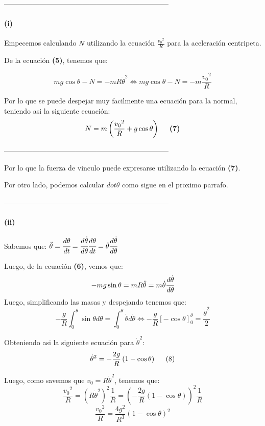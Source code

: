 \documentclass[fleqn,10pt]{SelfArx} %
\newcommand{\sii}{\Longleftrightarrow}
\begin{document}
---------------------------------------------------------------------

\paragraph{(i)}{
Empecemos calculando $N$ utilizando la ecuación $\frac{{v_0}^2}{R}$ para la aceleración centripeta.

De la ecuación \textbf{(5)}, tenemos que: 

\[ m g \cos{\theta} - N = - m R \dot{\theta}^2 \sii m g \cos{\theta} - N = - m \frac{{v_0}^2}{R} \]


Por lo que se puede despejar muy facilmente una ecuación para la normal, teniendo asi la siguiente ecuación: 
\[ N =  m \left( \frac{{v_0}^2}{R} +  g \cos{\theta} \right) \hspace{0.5cm} \textbf{(7)}\]
}

---------------------------------------------------------------------

Por lo que la fuerza de vinculo puede expresarse utilizando la ecuación \textbf{(7)}. 

Por otro lado, podemos calcular $dot{\theta}$ como sigue en el proximo parrafo.

---------------------------------------------------------------------

\paragraph{(ii)}{ 

Sabemos que: $\ddot{\theta} = \cfrac{d \theta}{dt} = \cfrac{d \dot{\theta}}{d{\theta} } \cfrac{d \theta}{dt} = \dot{\theta} \cfrac{d \dot{\theta}}{d{\theta} }$

Luego, de la ecuación \textbf{(6)}, vemos que:
\[- m g \sin{\theta}= m R \ddot{\theta} = m \dot{\theta} \cfrac{d \dot{\theta}}{d{\theta} }\]
Luego, simplificando las masas y despejando tenemos que:
\[- \frac{g}{R} \int_{0}^{\theta} \sin{\theta} d{\theta} = \int_{0}^{\dot{\theta}} \dot{\theta} d \dot{\theta} \sii -\frac{g}{R} \left[-\cos{\theta} \right]_{0}^{\theta}  = \frac{\dot{{\theta}}^2}{2} \]

Obteniendo asi la siguiente ecuación para $\dot{{\theta}}^2$:
\[ \dot{{\theta}}^2 = - \frac{2g}{R} \left(1- \cos{\theta} \right) \hspace{0.5cm} (8)\]

Luego, como savemos que $v_0 = R \dot{{\theta}}^2$, tenemos que:
\[\frac{{v_0}^2}{R} = (R \dot{{\theta}}^2)^2 \frac{1}{R} = \left(- \frac{2g}{R} (1- \cos{\theta})\right)^2 \frac{1}{R}\]
\[\frac{{v_0}^2}{R} = \frac{4g^2}{R^3} (1-\cos{\theta})^2\]
}
\end{document}
